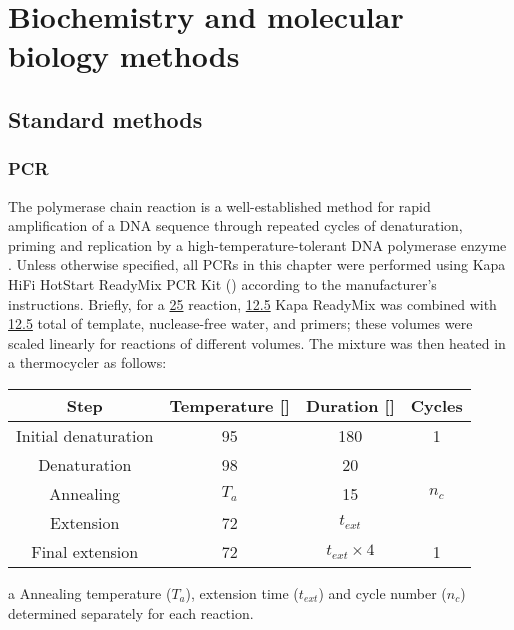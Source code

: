 \section{Biochemistry and molecular biology methods}

\subsection{Standard methods}

\subsubsection{PCR}
\label{sec:methods_molec_standard_pcr}


The polymerase chain reaction is a well-established method for rapid amplification of a DNA sequence through repeated cycles of denaturation, priming and replication by a high-temperature-tolerant DNA polymerase enzyme \parencite{paul2010hotstartpcr}. Unless otherwise specified, all PCRs in this chapter were performed using  Kapa HiFi HotStart ReadyMix PCR Kit () according to the manufacturer's instructions. Briefly, for a \ul{25} reaction, \ul{12.5} Kapa ReadyMix was combined with \ul{12.5} total of template, nuclease-free water, and primers; these volumes were scaled linearly for reactions of different volumes. The mixture was then heated in a thermocycler as follows:

\begin{center}
\begin{threeparttable}
\begin{tabular}{cccc}\toprule
\textbf{Step} & \textbf{Temperature [\degC{}]} & \textbf{Duration [\secs{}]} & \textbf{Cycles}\\\midrule
Initial denaturation & 95 & 180 & 1 \\\midrule
Denaturation & 98 & 20 & \multirow{3}{*}{$n_c$\tnote{1}}\\
Annealing & $T_a$\tnote{a} \tnote{} & 15 & \\
Extension & 72 & $t_{ext}$\tnote{a} & \\\midrule
Final extension & 72 & $t_{ext} \times 4$\tnote{a} & 1\\
\bottomrule\end{tabular}
\begin{tablenotes}
\item[a] Annealing temperature ($T_a$), extension time ($t_{ext}$) and cycle number ($n_c$) determined separately for each reaction.
\end{tablenotes}
\end{threeparttable}
\end{center}

